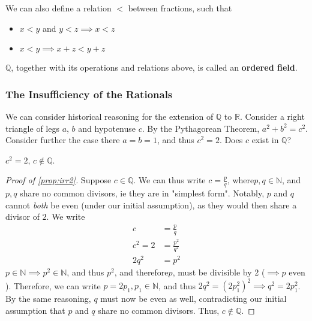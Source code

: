 \documentclass[12pt]{article}
\begin{document}
We can also define a relation $<$ between fractions, such that 
\begin{itemize}
  \item $x < y$ and $y < z \implies x < z$
  \item $x < y \implies x + z < y + z$
\end{itemize}

$\mathbb{Q}$, together with its operations and relations above, is called an \textbf{ordered field}.

\subsubsection{The Insufficiency of the Rationals}

We can consider historical reasoning for the extension of $\mathbb{Q}$ to $\mathbb{R}$. Consider a right triangle of legs $a$, $b$ and hypotenuse $c$. By the Pythagorean Theorem, $a^2 + b^2 = c^2$. Consider further the case there $a = b = 1$, and thus $c^2 = 2$. Does $c$ exist in $\mathbb{Q}$?
\begin{proposition}\label{prop:irr2}
  $c^2 = 2$, $c \notin \mathbb{Q}$.
\end{proposition} 
\begin{proof}[Proof of \cref{prop:irr2}]
  Suppose $c \in \mathbb{Q}$. We can thus write $c = \frac{p}{q}$, where\footnotemark  $p, q \in \mathbb{N}$, and $p, q$ share no common divisors, ie they are in "simplest form". Notably, $p$ and $q$ cannot \emph{both} be even (under our initial assumption), as they would then share a divisor of $2$. We write \begin{align*}
    c &= \frac{p}{q}\\
    c^2 = 2 & = \frac{p^2}{q^2}\\
    2q^2 &= p^2
  \end{align*}
  $p \in \mathbb{N} \implies p^2 \in \mathbb{N}$, and thus $p^2$, and therefore\footnotemark $p$, must be divisible by 2 ($\implies p \text{ even}$). Therefore, we can write $p = 2p_1, p_1 \in \mathbb{N}$, and thus $2q^2 = (2p_1^2)^2 \implies q^2 = 2p_1^2$. By the same reasoning, $q$ must now be even as well, contradicting our initial assumption that $p$ and $q$ share no common divisors. Thus, $c \notin \mathbb{Q}$.
\end{proof}

\end{document}
